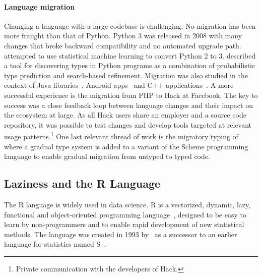 \documentclass[review,creen,acmsmall]{acmart}
\begin{document}
\paragraph{Language migration} Changing a language with a large codebase
is challenging. No migration has been more fraught than that of Python. Python 3
was released in 2008 with many changes that broke backward compatibility and no
automated upgrade path. \citet{Agg15} attempted to use statistical machine
learning to convert Python 2 to 3. \citet{Pra20} described a tool for
discovering types in Python programs as a combination of probabilistic type
prediction and search-based refinement. Migration was also studied in the
context of Java libraries~\cite{Xu19}, Android apps~\cite{Orso20} and C++
applications~\cite{OB20}. A more successful experience is the migration from PHP
to Hack at Facebook. The key to success was a close feedback loop between
language changes and their impact on the ecosystem at large. As all Hack users
share an employer and a source code repository, it was possible to test changes
and develop tools targeted at relevant usage patterns.\footnote{Private
  communication with the developers of Hack.} One last relevant thread of work
is the migratory typing of \citet{matthias06} where a gradual type system is
added to a variant of the Scheme programming language to enable gradual
migration from untyped to typed code.


\subsection{Laziness and the R Language}

The R language is widely used in data science. R is a vectorized, dynamic, lazy,
functional and object-oriented programming language~\cite{ecoop12}, designed to
be easy to learn by non-programmers and to enable rapid development of new
statistical methods. The language was created in 1993 by~\citet{R96} as a
successor to an earlier language for statistics named S~\cite{S88}.
\end{document}
